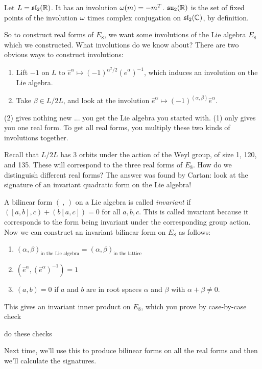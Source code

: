  \begin{example}
   Let $L=\mathfrak{sl}_2(\mathbb{R})$. It has an involution $\omega(m) = -m^T$. $\mathfrak{su}_2(\mathbb{R})$ is
   the set of fixed points of the involution $\omega$ times complex conjugation on
   $\mathfrak{sl}_2(\mathbb{C})$, by definition.
 \end{example}

 So to construct real forms of $E_8$, we want some involutions of the Lie algebra
 $E_8$ which we constructed. What involutions do we know about? There are two obvious
 ways to construct involutions:
 \begin{enumerate}
   \item Lift $-1$ on $L$ to $\hat e^\alpha \mapsto (-1)^{\alpha^2/2}(\hat
   e^\alpha)^{-1}$, which induces an involution on the Lie algebra.

   \item Take $\beta\in L/2L$, and look at the involution $\hat e^\alpha\mapsto
   (-1)^{(\alpha,\beta)} \hat e^\alpha$.
 \end{enumerate}
 (2) gives nothing new ... you get the Lie algebra you started with. (1) only gives
 you one real form. To get all real forms, you multiply these two kinds of involutions
 together.

 Recall that $L/2L$ has 3 orbits under the action of the Weyl group, of size 1, 120,
 and 135. These will correspond to the three real forms of $E_8$. How do we
 distinguish different real forms? The answer was found by Cartan: look at the
 signature of an invariant quadratic form on the Lie algebra!

 A bilinear form $(\ ,\,)$ on a Lie algebra is called \emph{invariant} if
 $([a,b],c)+(b[a,c])=0$ for all $a,b,c$. This is called invariant because it
 corresponds to the form being invariant under the corresponding group action. Now we
 can construct an invariant bilinear form on $E_8$ as follows:
 \begin{enumerate}
   \item $(\alpha,\beta)_\text{in the Lie algebra} = (\alpha,\beta)_\text{in the lattice}$
   \item $(\hat e^\alpha,(\hat e^\alpha)^{-1}) = 1$
   \item $(a,b)=0$ if $a$ and $b$ are in root spaces $\alpha$ and $\beta$ with
   $\alpha+\beta \neq 0$.
 \end{enumerate}
 This gives an invariant inner product on $E_8$, which you prove by case-by-case check
 \begin{exercise}
   do these checks
 \end{exercise}

 Next time, we'll use this to produce bilinear forms on all the real forms and then
 we'll calculate the signatures.
